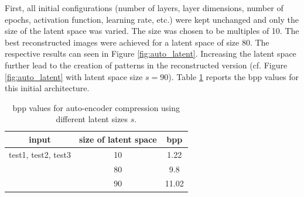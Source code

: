 \documentclass{article}
\begin{document}
First, all initial configurations (number of layers, layer dimensions, number of epochs, activation function, learning rate, etc.) were kept unchanged and only the size of the latent space was varied. The size was chosen to be multiples of 10. The best reconstructed images were achieved for a latent space of size $80$. The respective results can seen in Figure \ref{fig:auto_latent}. Increasing the latent space further lead to the creation of patterns in the reconstructed version (cf. Figure \ref{fig:auto_latent} with latent space size $s=90$). Table \ref{tab:auto_bpp} reports the bpp values for this initial architecture.\\

\begin{table}[]
    \centering
    \caption{bpp values for auto-encoder compression using different latent sizes $s$.}
    \begin{tabular}{c|c c}
        input & size of latent space  & bpp \\
        \hline 
        \hline
        \textsf{test1, test2, test3} & 10 & 1.22 \\
         & 80 & 9.8\\
        & 90 & 11.02\\
    \end{tabular}
    \label{tab:auto_bpp}
\end{table}
\end{document}
